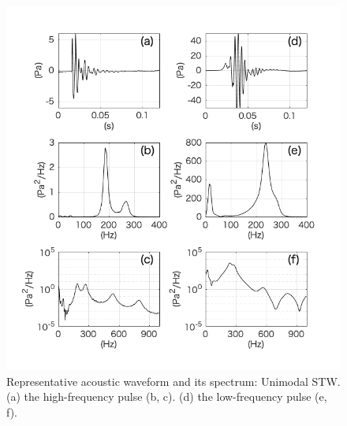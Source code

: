 \documentclass[12pt]{article}
\begin{document}
\begin{figure}[H]
\begin{center}
\includegraphics[scale=1] {Monowaveform.png} 
\caption{Representative acoustic waveform and its spectrum: Unimodal STW. (a) the high-frequency pulse (b, c). (d) the low-frequency pulse (e, f).}
\label{Monowaveform}
\end{center}
\end{figure}
\end{document}

